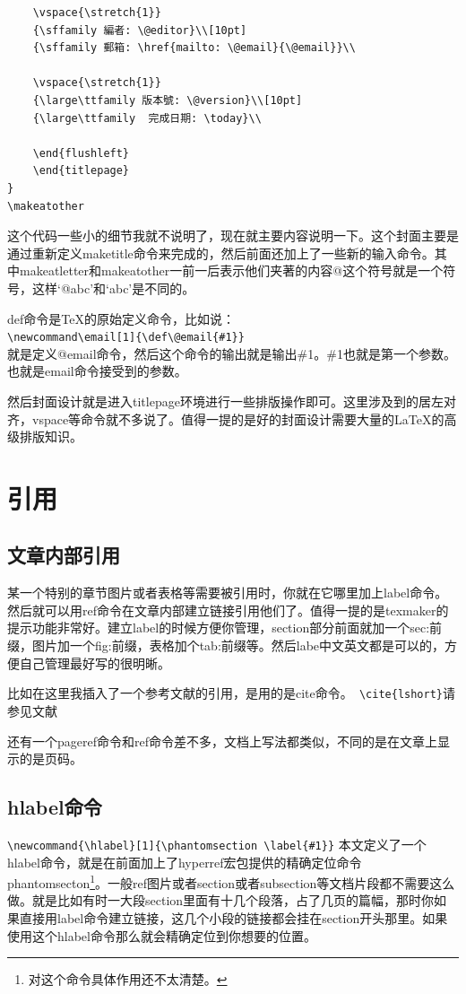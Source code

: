 \documentclass[11pt,oneside]{book}
\begin{document}
\begin{common-format}
\begin{Verbatim}
	\vspace{\stretch{1}}
	{\sffamily 編者: \@editor}\\[10pt]
	{\sffamily 郵箱: \href{mailto: \@email}{\@email}}\\
	
	\vspace{\stretch{1}}
	{\large\ttfamily 版本號: \@version}\\[10pt]
	{\large\ttfamily  完成日期: \today}\\
	
	\end{flushleft}
	\end{titlepage}
}
\makeatother
\end{Verbatim}
这个代码一些小的细节我就不说明了，现在就主要内容说明一下。这个封面主要是通过重新定义maketitle命令来完成的，然后前面还加上了一些新的输入命令。其中makeatletter和makeatother一前一后表示他们夹著的内容@这个符号就是一个符号，这样‘@abc’和‘abc’是不同的。

def命令是\TeX 的原始定义命令，比如说：\\
\verb+\newcommand\email[1]{\def\@email{#1}}+\\
就是定义@email命令，然后这个命令的输出就是输出\#{}1。\#{}1也就是第一个参数。也就是email命令接受到的参数。

然后封面设计就是进入titlepage环境进行一些排版操作即可。这里涉及到的居左对齐，vspace等命令就不多说了。值得一提的是好的封面设计需要大量的\LaTeX 的高级排版知识。


\section{引用}
\subsection{文章内部引用}
某一个特别的章节图片或者表格等需要被引用时，你就在它哪里加上label命令。然后就可以用ref命令在文章内部建立链接引用他们了。值得一提的是texmaker的提示功能非常好。建立label的时候方便你管理，section部分前面就加一个sec:前缀，图片加一个fig:前缀，表格加个tab:前缀等。然后labe中文英文都是可以的，方便自己管理最好写的很明晰。

比如在这里我插入了一个参考文献的引用，是用的是cite命令。\verb+ \cite{lshort}+请参见文献\cite{lshort}

还有一个pageref命令和ref命令差不多，文档上写法都类似，不同的是在文章上显示的是页码。

\subsection{hlabel命令}
\verb+\newcommand{\hlabel}[1]{\phantomsection \label{#1}}+
本文定义了一个hlabel命令，就是在前面加上了hyperref宏包提供的精确定位命令phantomsecton\footnote{对这个命令具体作用还不太清楚。}。一般ref图片或者section或者subsection等文档片段都不需要这么做。就是比如有时一大段section里面有十几个段落，占了几页的篇幅，那时你如果直接用label命令建立链接，这几个小段的链接都会挂在section开头那里。如果使用这个hlabel命令那么就会精确定位到你想要的位置。


\end{common-format}
\end{document}
